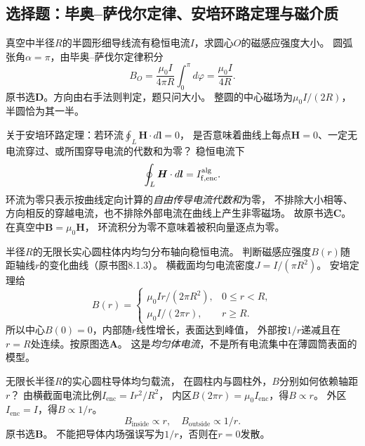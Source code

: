 
\subsection{选择题：毕奥--萨伐尔定律、安培环路定理与磁介质}

\problemtext 真空中半径$R$的半圆形细导线流有稳恒电流$I$，求圆心$O$的磁感应强度大小。
\workings
圆弧张角$\alpha=\pi$，由毕奥--萨伐尔定律积分
\[
 B_O=\frac{\mu_0 I}{4\pi R}\int_0^\pi d\varphi
 =\boxed{\frac{\mu_0 I}{4R}}.
\]
原书选\textbf{D}。方向由右手法则判定，题只问大小。
\crosscheck 整圆的中心磁场为$\mu_0I/(2R)$，半圆恰为其一半。

\problemtext 关于安培环路定理：若环流$\oint_L\bm H\cdot d\bm l=0$，
是否意味着曲线上每点$\bm H=0$、一定无电流穿过、或所围穿导电流的代数和为零？
\workings
稳恒电流下
\[
\oint_L\bm H\cdot d\bm l=I_{\mathrm f,\mathrm{enc}}^{\rm alg}.
\]
环流为零只表示按曲线定向计算的\emph{自由传导电流代数和}为零，
不排除大小相等、方向相反的穿越电流，也不排除外部电流在曲线上产生非零磁场。
故原书选\textbf{C}。
\crosscheck 在真空中$\bm B=\mu_0\bm H$，
环流积分为零不意味着被积向量逐点为零。

\problemtext 半径$R$的无限长实心圆柱体内均匀分布轴向稳恒电流。
判断磁感应强度$B(r)$随距轴线$r$的变化曲线（原书图8.1.3）。
\workings
横截面均匀电流密度$J=I/(\pi R^2)$。
安培定理给
\[
\boxed{B(r)=
\begin{cases}
\mu_0Ir/(2\pi R^2),&0\le r<R,\\
\mu_0I/(2\pi r),&r\ge R.
\end{cases}}
\]
所以中心$B(0)=0$，内部随$r$线性增长，表面达到峰值，
外部按$1/r$递减且在$r=R$处连续。按原图选\textbf{A}。
\crosscheck 这是\emph{均匀体电流}，不是所有电流集中在薄圆筒表面的模型。

\problemtext 无限长半径$R$的实心圆柱导体均匀载流，
在圆柱内与圆柱外，$B$分别如何依赖轴距$r$？
\workings
由横截面电流比例$I_{\mathrm{enc}}=I r^2/R^2$，
内区$B(2\pi r)=\mu_0I_{\mathrm{enc}}$，得$B\propto r$。
外区$I_{\mathrm{enc}}=I$，得$B\propto1/r$。
\[
\boxed{B_{\mathrm{inside}}\propto r,\quad B_{\mathrm{outside}}\propto1/r}.
\]
原书选\textbf{B}。
\crosscheck 不能把导体内场强误写为$1/r$，否则在$r=0$发散。

